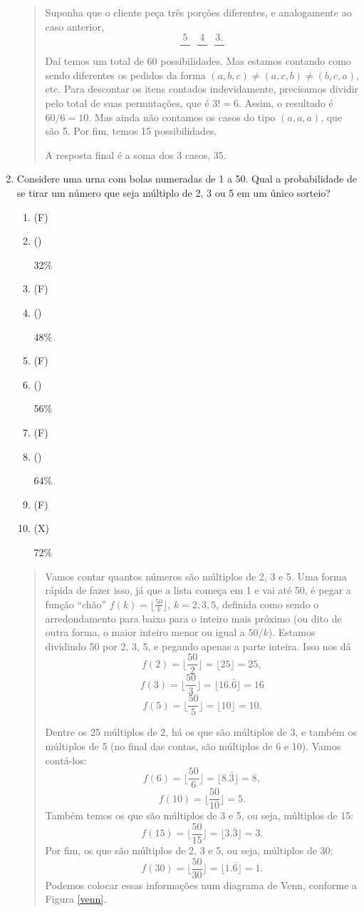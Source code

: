 \documentclass[12pt,a4paper]{article}
\newenvironment{ans}{\color{blue}\begin{quote}}{\end{quote}}
\newif \ifans
\newif \ifvf
\newcommand{\alt}{
	\ifvf
		\ifans
			\item({\sf\color{ForestGreen}V})
		\else 
			\item({\sf\color{Orange}F}) 
		\fi
	\else
		\ifans
			\item({\sf\color{Cyan}X})
		\else 
			\item({\sf\phantom{X}}) 
		\fi	
	\fi	
	\ansfalse
	\vffalse
}
\def\X{\anstrue}
\begin{document}
\begin{enumerate}
\begin{ans}
	Suponha que o cliente peça três porções diferentes, e analogamente ao caso anterior, 
	\[
	\frac{5}{\quad} \;\;\frac{4}{\quad}\;\;\frac{3.}{\quad}
	\]
	Daí temos um total de $60$ possibilidades. Mas estamos contando como sendo diferentes os pedidos da forma $(a,b,c)\neq(a,c,b)\neq(b,c,a)$, etc. Para descontar os itens contados indevidamente, precisamos dividir pelo total de suas permutações, que é $3!=6$. Assim, o resultado é $60/6=10$. Mas ainda não contamos os casos do tipo $(a,a,a)$, que são 5. Por fim, temos 15 possibilidades.
	
	A resposta final é a soma dos 3 casos, 35.
	
	\end{ans}









\item Considere uma urna com bolas numeradas de 1 a 50. Qual a probabilidade de se tirar um número que seja múltiplo de 2, 3 ou 5 em um único sorteio?
	\begin{enumerate}
	\alt 32\%
	\alt 48\%
	\alt 56\%
	\alt 64\%
	\X\alt 72\%
	\end{enumerate}
	
	\begin{ans} 
	Vamos contar quantos números são múltiplos de 2, 3 e 5. Uma forma rápida de fazer isso, já que a lista começa em 1 e vai até 50, é pegar a função ``chão'' $f(k)=\lfloor \frac{50}{k}\rfloor$, $k=2,3,5$, definida como sendo o arredondamento para baixo para o inteiro mais próximo (ou dito de outra forma, o maior inteiro menor ou igual a $50/k$). Estamos dividindo 50 por 2, 3, 5, e pegando apenas a parte inteira. 
	Isso nos dá 
	\[
	f(2)=\lfloor \frac{50}{2}\rfloor=\lfloor 25\rfloor=25,
	\]
	\[
	f(3)=\lfloor \frac{50}{3}\rfloor=\lfloor 16.\bar 6\rfloor=16
	\]
	\[
	f(5)=\lfloor \frac{50}{5}\rfloor=\lfloor 10\rfloor=10.
	\]
	
	Dentre os 25 múltiplos de 2, há os que são múltiplos de 3, e também os múltiplos de 5 (no final das contas, são múltiplos de 6 e 10). Vamos contá-los:
	 \[
	 f(6)=\lfloor \frac{50}{6}\rfloor=\lfloor 8.\bar 3\rfloor=8,
	 \]
	 \[
	 f(10)=\lfloor \frac{50}{10}\rfloor=5.
	 \] Também temos os que são múltiplos de 3 e 5, ou seja, múltiplos de 15:
	 \[
	 f(15)=\lfloor \frac{50}{15}\rfloor=\lfloor 3.\bar 3\rfloor=3.
	 \]
	 Por fim, os que são múltiplos de 2, 3 e 5, ou seja, múltiplos de 30:
	 \[
	 f(30)=\lfloor \frac{50}{30}\rfloor=\lfloor 1.\bar 6\rfloor=1.
	 \]
	 Podemos colocar essas informações num diagrama de Venn, conforme a Figura \ref{venn}. 
	 

\end{ans}
\end{enumerate}
\end{document}
